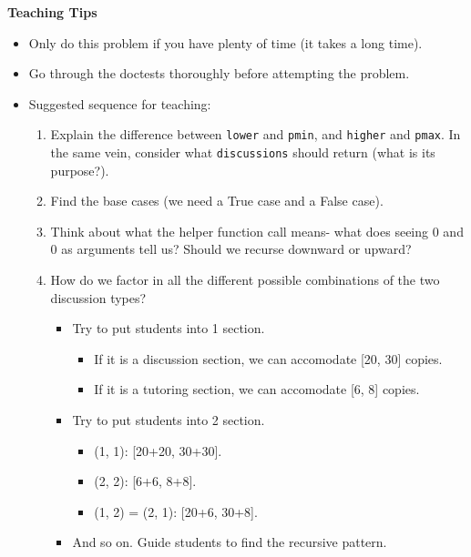     \begin{guide}
    \begin{blocksection}
    \textbf{Teaching Tips}
    \begin{itemize}
        \item Only do this problem if you have plenty of time (it takes a long time).
        \item Go through the doctests thoroughly before attempting the problem.
        \item Suggested sequence for teaching:
        \begin{enumerate}
            \item Explain the difference between \lstinline{lower} and \lstinline{pmin}, and \lstinline{higher} and \lstinline{pmax}. In the same vein, consider what \lstinline{discussions} should return (what is its purpose?).
            \item Find the base cases (we need a True case and a False case).
            \item Think about what the helper function call means- what does seeing 0 and 0 as arguments tell us? Should we recurse downward or upward?
            \item How do we factor in all the different possible combinations of the two discussion types?
            \begin{itemize}
                \item Try to put students into 1 section.
                \begin{itemize}
                    \item If it is a discussion section, we can accomodate [20, 30] copies.
                    \item If it is a tutoring section, we can accomodate [6, 8] copies.
                \end{itemize}
                \item Try to put students into 2 section.
                \begin{itemize}
                    \item (1, 1): [20+20, 30+30].
                    \item (2, 2): [6+6, 8+8].
                    \item (1, 2) = (2, 1): [20+6, 30+8].
                \end{itemize}
                \item And so on. Guide students to find the recursive pattern.
    
            \end{itemize}
        \end{enumerate}
    \end{itemize}
    \end{blocksection}
    \end{guide}
    